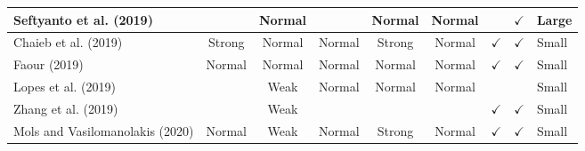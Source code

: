\documentclass[../access.tex]{subfiles}
\begin{document}
\begin{table}[htbp]
\begin{adjustwidth}{-2cm}{}
\begin{tabular}{m{4.4cm} c c c c c c c >{\centering\arraybackslash}m{0.7cm}}
            \hline
            \footnotesize{Seftyanto et al. (2019) \cite{Seftyanto2019}}    & {}                                                                                          & {Normal}                                         & {}                     & {Normal}                     & {Normal}                  & {}                      & $ \checkmark $            & \footnotesize{Large} \\
            \hline
            \footnotesize{Chaieb et al. (2019) \cite{Chaieb2019}}          & {Strong}                                                                                    & {Normal}                                         & {Normal}               & {Strong}                     & {Normal}                  & $ \checkmark $          & $ \checkmark $            & \footnotesize{Small} \\
            \hline
            \footnotesize{Faour (2019) \cite{Faour2019}}                   & {Normal}                                                                                    & {Normal}                                         & {Normal}               & {Normal}                     & {Normal}                  & $ \checkmark $          & $ \checkmark $            & \footnotesize{Small} \\
            \hline
            \footnotesize{Lopes et al. (2019) \cite{Lopes2019}}            & {}                                                                                          & {Weak}                                           & {Normal}               & {Normal}                     & {Normal}                  & {}                      & {}                        & \footnotesize{Small} \\
            \hline
            \footnotesize{Zhang et al. (2019) \cite{Zhang2019a}}           & {}                                                                                          & {Weak}                                           & {}                     & {}                           & {}                        & $ \checkmark $          & $ \checkmark $            & \footnotesize{Small} \\
            \hline
            \footnotesize{Mols and Vasilomanolakis (2020) \cite{Mols2020}} & {Normal}                                                                                    & {Weak}                                           & {Normal}               & {Strong}                     & {Normal}                  & $ \checkmark $          & $ \checkmark $            & \footnotesize{Small} \\

\end{tabular}
\end{adjustwidth}
\end{table}
\end{document}
